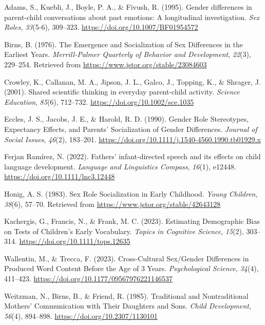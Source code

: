 \documentclass[
  man]{apa6}
\newlength{\cslhangindent}
\newlength{\cslentryspacingunit} %
\newenvironment{CSLReferences}[2] %
 {%
  \setlength{\parindent}{0pt}
  \ifodd #1
  \let\oldpar\par
  \def\par{\hangindent=\cslhangindent\oldpar}
  \fi
  \setlength{\parskip}{#2\cslentryspacingunit}
 }%
 {}
\begin{document}
\hypertarget{refs}{}
\begin{CSLReferences}{1}{0}
\leavevmode{}%
Adams, S., Kuebli, J., Boyle, P. A., \& Fivush, R. (1995). Gender differences in parent-child conversations about past emotions: {A} longitudinal investigation. \emph{Sex Roles}, \emph{33}(5-6), 309--323. \url{https://doi.org/10.1007/BF01954572}

\leavevmode{}%
Birns, B. (1976). The {Emergence} and {Socialization} of {Sex Differences} in the {Earliest Years}. \emph{Merrill-Palmer Quarterly of Behavior and Development}, \emph{22}(3), 229--254. Retrieved from \url{https://www.jstor.org/stable/23084603}

\leavevmode{}%
Crowley, K., Callanan, M. A., Jipson, J. L., Galco, J., Topping, K., \& Shrager, J. (2001). Shared scientific thinking in everyday parent-child activity. \emph{Science Education}, \emph{85}(6), 712--732. \url{https://doi.org/10.1002/sce.1035}

\leavevmode{}%
Eccles, J. S., Jacobs, J. E., \& Harold, R. D. (1990). Gender {Role Stereotypes}, {Expectancy Effects}, and {Parents}' {Socialization} of {Gender Differences}. \emph{Journal of Social Issues}, \emph{46}(2), 183--201. \url{https://doi.org/10.1111/j.1540-4560.1990.tb01929.x}

\leavevmode{}%
Ferjan Ramírez, N. (2022). Fathers' infant-directed speech and its effects on child language development. \emph{Language and Linguistics Compass}, \emph{16}(1), e12448. \url{https://doi.org/10.1111/lnc3.12448}

\leavevmode{}%
Honig, A. S. (1983). Sex {Role Socialization} in {Early Childhood}. \emph{Young Children}, \emph{38}(6), 57--70. Retrieved from \url{https://www.jstor.org/stable/42643128}

\leavevmode{}%
Kachergis, G., Francis, N., \& Frank, M. C. (2023). Estimating {Demographic Bias} on {Tests} of {Children}'s {Early Vocabulary}. \emph{Topics in Cognitive Science}, \emph{15}(2), 303--314. \url{https://doi.org/10.1111/tops.12635}

\leavevmode{}%
Wallentin, M., \& Trecca, F. (2023). Cross-{Cultural Sex}/{Gender Differences} in {Produced Word Content Before} the {Age} of 3 {Years}. \emph{Psychological Science}, \emph{34}(4), 411--423. \url{https://doi.org/10.1177/09567976221146537}

\leavevmode{}%
Weitzman, N., Birns, B., \& Friend, R. (1985). Traditional and {Nontraditional Mothers}' {Communication} with {Their Daughters} and {Sons}. \emph{Child Development}, \emph{56}(4), 894--898. \url{https://doi.org/10.2307/1130101}

\end{CSLReferences}

\endgroup
\end{document}
